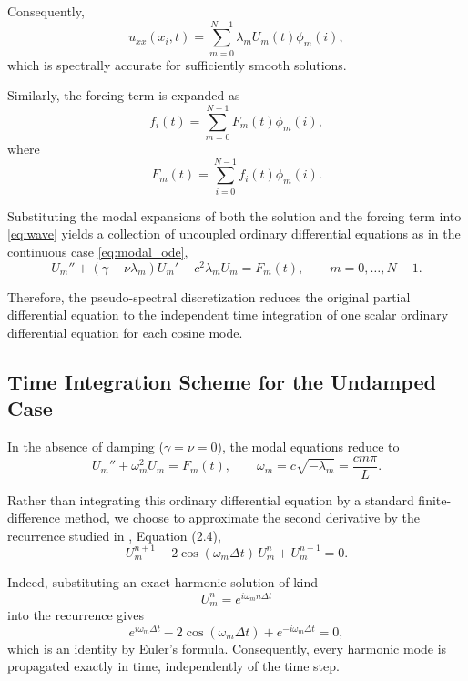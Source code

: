 \documentclass{Configuration_Files/PoliMi3i_thesis}
\begin{document}
Consequently,
\begin{equation*}
u_{xx}(x_i,t)
=
\sum_{m=0}^{N-1}
\lambda_m
U_m(t)
\phi_m(i),
\end{equation*}
which is spectrally accurate for sufficiently smooth solutions.

Similarly, the forcing term is expanded as
\begin{equation*}
f_i(t)
=
\sum_{m=0}^{N-1}
F_m(t)\phi_m(i),
\end{equation*}
where
\begin{equation*}
F_m(t)
=
\sum_{i=0}^{N-1}
f_i(t)\phi_m(i).
\end{equation*}

Substituting the modal expansions of both the solution and the forcing term into \eqref{eq:wave} yields a collection of uncoupled ordinary differential equations as in the continuous case \eqref{eq:modal_ode},
\begin{equation*}
U_m''
+
\left(
\gamma
-
\nu\lambda_m
\right)
U_m'
-
c^2\lambda_mU_m
=
F_m(t),
\qquad
m=0,\ldots,N-1.
\end{equation*}

Therefore, the pseudo-spectral discretization reduces the original partial differential equation to the independent time integration of one scalar ordinary differential equation for each cosine mode.

\subsection{Time Integration Scheme for the Undamped Case}
In the absence of damping ($\gamma=\nu=0$), the modal equations reduce to
\begin{equation*}
U_m''
+\omega_m^2U_m
=
F_m(t),
\qquad
\omega_m
=
c\sqrt{-\lambda_m}
=
\frac{cm\pi}{L}.
\end{equation*}

Rather than integrating this ordinary differential equation by a standard finite-difference method, we choose to approximate the second derivative by the recurrence studied in \cite{cieslinski_exact_2011}, Equation (2.4),
\begin{equation*}
U_m^{n+1}
-
2\cos(\omega_m\Delta t)\,
U_m^n
+
U_m^{n-1}
=
0.
\end{equation*}

Indeed, substituting an exact harmonic solution of kind
\begin{equation*}
U_m^n
=
e^{i\omega_mn\Delta t}
\end{equation*}
into the recurrence gives
\begin{equation*}
e^{i\omega_m\Delta t}
-
2\cos(\omega_m\Delta t)
+
e^{-i\omega_m\Delta t}
=
0,
\end{equation*}
which is an identity by Euler's formula. Consequently, every harmonic mode is propagated exactly in time, independently of the time step.
\end{document}
